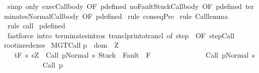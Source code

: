 \begin{isabellebody}
%
\isadelimproof
%
\endisadelimproof
%
\isatagproof
{}\isamarkupfalse%
\ {\isacharparenleft}simp\ only{\isacharcolon}\ exec{\isacharunderscore}Call{\isacharunderscore}body{\isacharprime}\ {\isacharbrackleft}OF\ p{\isacharunderscore}defined{\isacharbrackright}\ noFaultStuck{\isacharunderscore}Call{\isacharunderscore}body{\isacharprime}\ {\isacharbrackleft}OF\ p{\isacharunderscore}defined{\isacharbrackright}\ terminates{\isacharunderscore}Normal{\isacharunderscore}Call{\isacharunderscore}body\ {\isacharbrackleft}OF\ p{\isacharunderscore}defined{\isacharbrackright}{\isacharparenright}\isanewline
{}\isamarkupfalse%
\ {\isacharparenleft}rule\ conseqPre{\isacharparenright}\isanewline
{}\isamarkupfalse%
\ {\isacharparenleft}rule\ Call{\isacharunderscore}lemma{\isacharprime}{\isacharparenright}\isanewline
{}\isamarkupfalse%
\ {\isacharparenleft}rule\ call{\isacharparenright}\isanewline
{}\isamarkupfalse%
\ p{\isacharunderscore}defined\isanewline
{}\isamarkupfalse%
\ {\isacharparenleft}fastforce\ intro{\isacharcolon}\ terminates{\isachardot}intros\ tranclp{\isachardot}r{\isacharunderscore}into{\isacharunderscore}trancl\ {\isacharbrackleft}of\ {\isachardoublequoteopen}{\isacharparenleft}step\ {\isasymGamma}{\isacharparenright}{\isachardoublequoteclose}{\isacharcomma}\ OF\ step{\isachardot}Call{\isacharbrackright}\ \isanewline
root{\isacharunderscore}in{\isacharunderscore}redexes{\isacharparenright}\isanewline
{}\isamarkupfalse%
%
\endisatagproof
{\isafoldproof}%
%
\isadelimproof
\isanewline
%
\endisadelimproof
\isanewline
{}\isamarkupfalse%
\ MGT{\isacharunderscore}Call{\isacharcolon}\isanewline
{\isachardoublequoteopen}{\isasymforall}p\ {\isasymin}\ dom\ {\isasymGamma}{\isachardot}\ {\isasymforall}Z{\isachardot}\ \isanewline
\ \ {\isasymGamma}{\isacharcomma}{\isasymTheta}\ {\isasymturnstile}\isactrlsub t\isactrlbsub {\isacharslash}F\isactrlesub \ {\isacharbraceleft}s{\isachardot}\ s{\isacharequal}Z\ {\isasymand}\ {\isasymGamma}{\isasymturnstile}{\isasymlangle}Call\ p{\isacharcomma}Normal\ s{\isasymrangle}\ {\isasymRightarrow}{\isasymnotin}{\isacharparenleft}{\isacharbraceleft}Stuck{\isacharbraceright}\ {\isasymunion}\ Fault\ {\isacharbackquote}\ {\isacharparenleft}{\isacharminus}F{\isacharparenright}{\isacharparenright}\ {\isasymand}\ \isanewline
\ \ \ \ \ \ \ \ \ \ \ \ \ {\isasymGamma}{\isasymturnstile}{\isacharparenleft}Call\ p{\isacharparenright}{\isasymdown}Normal\ s{\isacharbraceright}\isanewline
\ \ \ \ \ \ \ \ \ \ \ {\isacharparenleft}Call\ p{\isacharparenright}\isanewline

\end{isabellebody}
